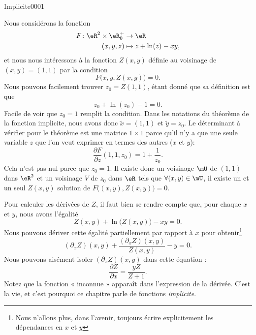 
\begin{corrige}{Implicite0001}

	Nous considérons la fonction
	\begin{equation}
		\begin{aligned}
			F\colon \eR^2\times \eR_0^+&\to \eR \\
			(x,y,z)&\mapsto z+\ln(z)-xy, 
		\end{aligned}
	\end{equation}
	et nous nous intéressons à la fonction $Z(x,y)$ définie au voisinage de $(x,y)=(1,1)$ par la condition
	\begin{equation}
		F\big( x,y,Z(x,y) \big)=0.
	\end{equation}
	Nous pouvons facilement trouver $z_0=Z(1,1)$, étant donné que sa définition est que
	\begin{equation}
		z_0+\ln(z_0)-1=0.
	\end{equation}
	Facile de voir que $z_0=1$ remplit la condition. Dans les notations du théorème de la fonction implicite, nous avons donc $\tilde x=(1,1)$ et $\tilde y=z_0$. Le déterminant à vérifier pour le théorème est une matrice $1\times 1$ parce qu'il n'y a que une seule variable $z$ que l'on veut exprimer en termes des autres ($x$ et $y$):
	\begin{equation}
		\frac{ \partial F }{ \partial z }(1,1,z_0)=1+\frac{1}{ z_0 }.
	\end{equation}
	Cela n'est pas nul parce que $z_0=1$. Il existe donc un voisinage $\mU$ de $(1,1)$ dans $\eR^2$ et un voisinage $V$ de $z_0$ dans $\eR$ tels que $\forall (x,y)\in\mU$, il existe un et un seul $Z(x,y)$ solution de $F\big( (x,y),Z(x,y) \big)=0$.

	Pour calculer les dérivées de $Z$, il faut bien se rendre compte que, pour chaque $x$ et $y$, nous avons l'égalité
	\begin{equation}
		Z(x,y)+\ln\big( Z(x,y) \big)-xy=0.
	\end{equation}
	Nous pouvons dériver cette égalité partiellement par rapport à $x$ pour obtenir\footnote{Nous n'allons plus, dans l'avenir, toujours écrire explicitement les dépendances en $x$ et $y$}
	\begin{equation}		\label{EqPartialXZexoI}
		(\partial_xZ)(x,y)+\frac{ (\partial_xZ)(x,y) }{ Z(x,y) }-y=0.
	\end{equation}
	Nous pouvons aisément isoler $(\partial_xZ)(x,y)$ dans cette équation :
	\begin{equation}
		\frac{ \partial Z }{ \partial x }=\frac{ yZ }{ Z+1 }.
	\end{equation}
	Notez que la fonction « inconnue » apparaît dans l'expression de la dérivée. C'est la vie, et c'est pourquoi ce chapitre parle de fonctions \emph{implicite}.


\end{corrige}

